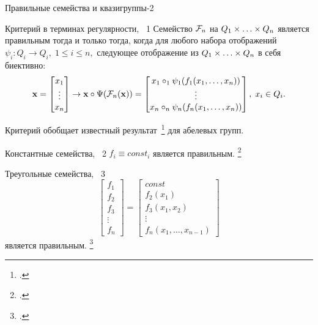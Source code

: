 \begin{frame}{Правильные семейства и квазигруппы-2}
    \begin{mytheorem}{Критерий в терминах регулярности, \thm~1}
    \label{thm:regularity}
        Семейство $\mathcal{F}_n$ на $Q_1 \times \ldots \times Q_n$ является правильным тогда и только тогда, когда для любого набора отображений 
        \(
            \psi_i \colon Q_i \to Q_i, \; 1 \le i \le n,
        \)
        следующее отображение из $Q_1 \times \ldots \times Q_n$ в себя биективно:
        \[
            \mathbf{x} = 
            \begin{bmatrix}
                x_1\\
                \vdots \\
                x_n \\
            \end{bmatrix} 
            \to
            \mathbf{x} \circ \Psi(\mathcal{F}_n(\mathbf{x}))
            = 
            \begin{bmatrix}
                x_1 \circ_1 \psi_1(f_1(x_1, \ldots, x_n)) \\
                \vdots \\
                x_n \circ_n \psi_n(f_n(x_1, \ldots, x_n))
            \end{bmatrix}, \; x_i \in Q_i.
        \]
    \end{mytheorem}
    Критерий обобщает известный результат~\footcite{nosov06abel} для абелевых групп.
\end{frame}


\begin{frame}
    \begin{mypropos}{Константные семейства, \exa~2}
        $f_i \equiv const_i$ является правильным.
        \footcitetext{nosov06abel}
    \end{mypropos}
    \pause 
    \begin{mypropos}{Треугольные семейства, \exa~3}
        \[
            \begin{bmatrix}
                f_1 \\
                f_2 \\
                f_3 \\
                \vdots \\
                f_n 
            \end{bmatrix}
            =
            \begin{bmatrix}
                const \\
                f_{2}(x_{1}) \\
                f_{3}(x_{1}, x_{2}) \\
                \vdots \\
                f_{n}(x_{1}, \ldots, x_{n-1})
            \end{bmatrix}
        \]
        является правильным.
        \footcitetext{nosov06abel}
    \end{mypropos}
\end{frame}


